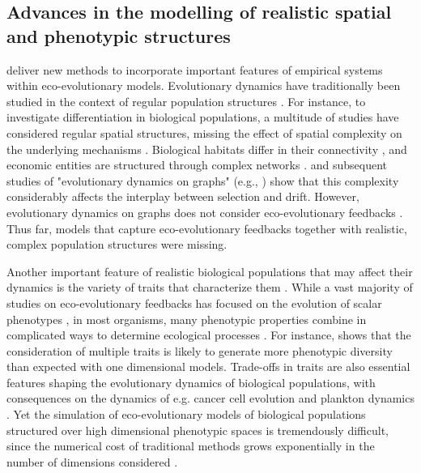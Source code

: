 \subsection{Advances in the modelling of realistic spatial and phenotypic structures}

\Cref{\chapi,\chapiv} deliver new methods to incorporate important features of empirical systems within eco-evolutionary models.
% 
Evolutionary dynamics have traditionally been studied in the context of regular population structures \citep{LiebermanHauert2005}.
% 
For instance, to investigate differentiation in biological populations, a multitude of studies have considered regular spatial structures, missing the effect of spatial complexity on the underlying mechanisms \citep{Slatkin1973,Slatkin1978,Kirkpatrick1997,Polechova2015,Polechova2018,AndradeRestrepo2019,Doebeli2003,Meszena1997,Yeaman2011,Debarre2013,Mirrahimi2020}.
% 
Biological habitats differ in their connectivity \citep{Dale2010}, and economic entities are structured through complex networks \citep{Schweitzer2009}. \cite{LiebermanHauert2005} and subsequent studies of "evolutionary dynamics on graphs" (e.g., \cite{Tkadlec2019}) show that this complexity considerably affects the interplay between selection and drift. However, evolutionary dynamics on graphs does not consider eco-evolutionary feedbacks \citep{Govaert2019}.
% 
Thus far, models that capture eco-evolutionary feedbacks together with realistic, complex population structures were missing.

Another important feature of realistic biological populations that may affect their dynamics is the variety of traits that characterize them \citep{Doebeli2011}. While a vast majority of studies on eco-evolutionary feedbacks has focused on the evolution of scalar phenotypes \citep{Doebeli2011}, in most organisms, many phenotypic properties combine in complicated ways to determine ecological processes \citep{Doebeli2014}.
% 
For instance, \cite{Doebeli2011} shows that the consideration of multiple traits is likely to generate more phenotypic diversity than expected with one dimensional models.
% 
Trade-offs in traits are also essential features shaping the evolutionary dynamics of biological populations, with consequences on the dynamics of e.g. cancer cell evolution \citep{Fiandaca2021} and plankton dynamics \citep{LeGland2020}.
% 
Yet the simulation of eco-evolutionary models of biological populations structured over high dimensional phenotypic spaces is tremendously difficult, since the numerical cost of traditional methods grows exponentially in the number of dimensions considered \citep{Bellman1957}. 

